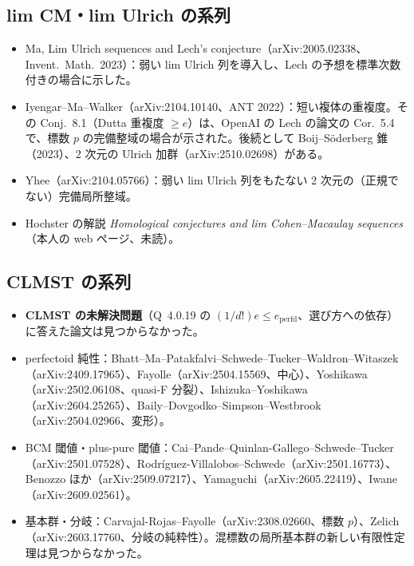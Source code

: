 \documentclass[11pt,a4paper]{ltjsarticle}
\theoremstyle{plain}
\theoremstyle{definition}
\theoremstyle{remark}
\theoremstyle{plain}
\begin{document}
\subsection{lim CM・lim Ulrich の系列}
\begin{itemize}
  \item Ma, Lim Ulrich sequences and Lech's conjecture（arXiv:2005.02338、Invent.\ Math.\ 2023）：弱い lim Ulrich 列を導入し、Lech の予想を標準次数付きの場合に示した。
  \item Iyengar--Ma--Walker（arXiv:2104.10140、ANT 2022）：短い複体の重複度。その Conj.~8.1（Dutta 重複度 $\ge e$）は、OpenAI の Lech の論文の Cor.~5.4 で、標数 $p$ の完備整域の場合が示された。後続として Boij--Söderberg 錐（2023）、2 次元の Ulrich 加群（arXiv:2510.02698）がある。
  \item Yhee（arXiv:2104.05766）：弱い lim Ulrich 列をもたない 2 次元の（正規でない）完備局所整域。
  \item Hochster の解説 \emph{Homological conjectures and lim Cohen--Macaulay sequences}（本人の web ページ、未読）。
\end{itemize}

\subsection{CLMST の系列}
\begin{itemize}
  \item \textbf{CLMST の未解決問題}（Q~4.0.19 の $(1/d!)e\le e_{\mathrm{perfd}}$、選び方への依存）に答えた論文は見つからなかった。
  \item perfectoid 純性：Bhatt--Ma--Patakfalvi--Schwede--Tucker--Waldron--Witaszek（arXiv:2409.17965）、Fayolle（arXiv:2504.15569、中心）、Yoshikawa（arXiv:2502.06108、quasi-F 分裂）、Ishizuka--Yoshikawa（arXiv:2604.25265）、Baily--Dovgodko--Simpson--Westbrook（arXiv:2504.02966、変形）。
  \item BCM 閾値・plus-pure 閾値：Cai--Pande--Quinlan-Gallego--Schwede--Tucker（arXiv:2501.07528）、Rodríguez-Villalobos--Schwede（arXiv:2501.16773）、Benozzo ほか（arXiv:2509.07217）、Yamaguchi（arXiv:2605.22419）、Iwane（arXiv:2609.02561）。
  \item 基本群・分岐：Carvajal-Rojas--Fayolle（arXiv:2308.02660、標数 $p$）、Zelich（arXiv:2603.17760、分岐の純粋性）。混標数の局所基本群の新しい有限性定理は見つからなかった。
\end{itemize}
\end{document}
